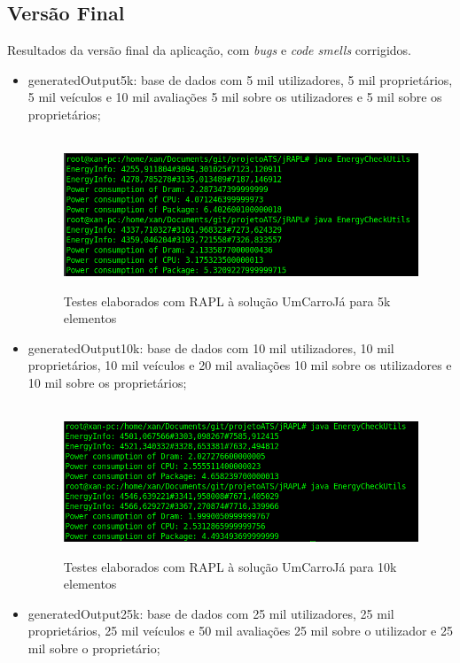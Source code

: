 \subsection{Versão Final}\hfill
\newline
\par Resultados da versão final da aplicação, com \textit{bugs} e \textit{code smells} corrigidos.
\begin{itemize}
    \item generatedOutput5k: base de dados com 5 mil utilizadores, 5 mil proprietários, 5 mil veículos e 10 mil avaliações 5 mil sobre os utilizadores e 5 mil sobre os proprietários;\newline
    
        \begin{figure}[H]
            \hbox{\hspace{-4em} \includegraphics[width=1.2\textwidth]{images/rapl_5k.png}}
            \label{fig52}
            \caption{Testes elaborados com RAPL à solução UmCarroJá para 5k elementos}
        \end{figure}
   
    \item generatedOutput10k: base de dados com 10 mil utilizadores, 10 mil proprietários, 10 mil veículos e 20 mil avaliações 10 mil sobre os utilizadores e 10 mil sobre os proprietários;
    
        \begin{figure}[H]
            \hbox{\hspace{-4em} \includegraphics[width=1.2\textwidth]{images/rapl_10k.png}}
            \label{fig53}
            \caption{Testes elaborados com RAPL à solução UmCarroJá para 10k elementos}
        \end{figure}
    \newpage
    \item generatedOutput25k: base de dados com 25 mil utilizadores, 25 mil proprietários, 25 mil veículos e 50 mil avaliações 25 mil sobre o utilizador e 25 mil sobre o proprietário;
    

\end{itemize}
